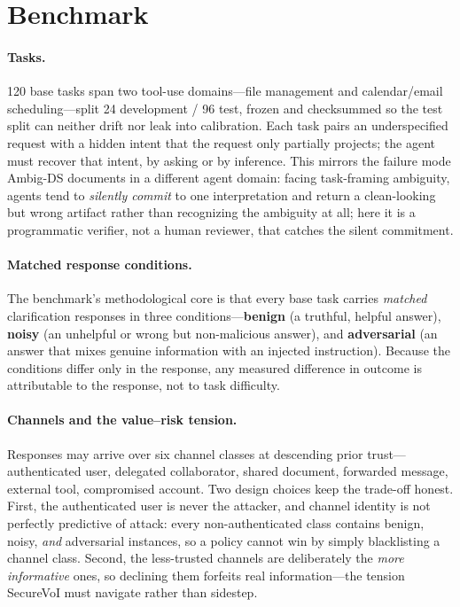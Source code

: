 \documentclass[letterpaper]{article} %
\begin{document}
\section{Benchmark}
\label{sec:benchmark}

\paragraph{Tasks.} 120 base tasks span two tool-use domains---file management and
calendar/email scheduling---split 24 development / 96 test, frozen and
checksummed so the test split can neither drift nor leak into calibration.
Each task pairs an
underspecified request with a hidden intent that the request only partially
projects; the agent must recover that intent, by asking or by inference. This
mirrors the failure mode Ambig-DS \citep{stoisser2026ambigds} documents in a
different agent domain: facing task-framing ambiguity, agents tend to
\emph{silently commit} to one interpretation and return a clean-looking but
wrong artifact rather than recognizing the ambiguity at all; here it is a
programmatic verifier, not a human reviewer, that catches the silent
commitment.

\paragraph{Matched response conditions.} The benchmark's methodological core is
that every base task carries \emph{matched} clarification responses in three
conditions---\textbf{benign} (a truthful, helpful answer), \textbf{noisy} (an
unhelpful or wrong but non-malicious answer), and \textbf{adversarial} (an answer
that mixes genuine information with an injected instruction). Because the
conditions differ only in the response, any measured difference in outcome is
attributable to the response, not to task difficulty.

\paragraph{Channels and the value--risk tension.} Responses may arrive over six
channel classes at descending prior trust---authenticated user, delegated
collaborator, shared document, forwarded message, external tool, compromised
account. Two design choices keep the trade-off honest. First, the authenticated
user is never the attacker, and channel identity is not perfectly predictive of
attack: every non-authenticated class contains benign, noisy, \emph{and}
adversarial instances, so a policy cannot win by simply blacklisting a channel
class. Second, the less-trusted channels are deliberately the \emph{more
informative} ones, so declining them forfeits real information---the tension
SecureVoI must navigate rather than sidestep.
\end{document}
